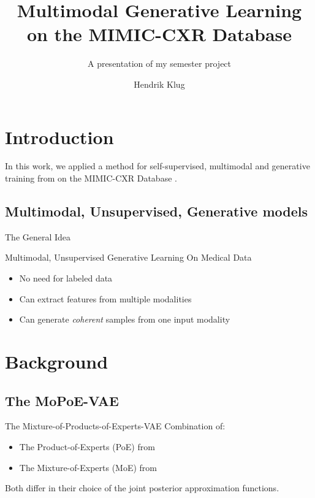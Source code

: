 

\title{Multimodal Generative Learning on the MIMIC-CXR Database}
\subtitle{A presentation of my semester project}
\author{Hendrik Klug}

    \begin{frame}
        \titlepage
    \end{frame}


    \section{Introduction}

    \begin{frame}
        In this work, we applied a method for self-supervised, multimodal and generative training from \cite{thomas_multimodal} on the MIMIC-CXR Database \cite{johnson2019mimic}.
    \end{frame}

    \subsection{Multimodal, Unsupervised, Generative models}
    \begin{frame}{The General Idea}
    \end{frame}

    \begin{frame}{Multimodal, Unsupervised Generative Learning On Medical Data}
        \begin{itemize}
            \item No need for labeled data
            \item Can extract features from multiple modalities
            \item Can generate \textit{coherent} samples from one input modality
        \end{itemize}
    \end{frame}


    \section{Background}

    \subsection{The MoPoE-VAE \cite{thomas_gener-ELBO}}
    \begin{frame}{The Mixture-of-Products-of-Experts-VAE}
        Combination of:
        \begin{itemize}
            \item The Product-of-Experts (PoE) from \cite{wu2018multimodal}
            \item The Mixture-of-Experts (MoE) from \cite{shi2019variational}
        \end{itemize}
        \vspace{\baselineskip}
        Both differ in their choice of the joint posterior approximation functions.
    \end{frame}

